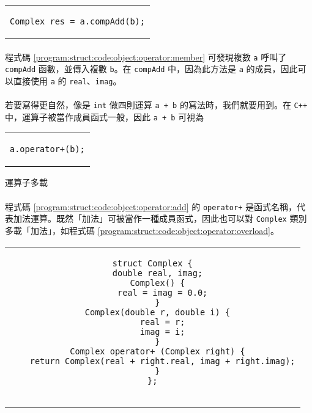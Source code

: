 \documentclass[12pt,a4paper,oneside]{report}
\begin{document}
\begin{CJK}{UTF8}{bkai}
\begin{code}[h!]
\begin{tabular}{c}
\begin{lstlisting}
Complex res = a.compAdd(b);
\end{lstlisting}
\end{tabular}
\caption{\lstinline!Complex! 相加}
\label{program:struct:code:object:operator:member}
\end{code}

\paragraph{}程式碼 \ref{program:struct:code:object:operator:member} 可發現複數 \lstinline!a! 呼叫了 \lstinline!compAdd! 函數，並傳入複數 \lstinline!b!。在 \lstinline!compAdd! 中，因為此方法是 \lstinline!a! 的成員，因此可以直接使用 \lstinline!a! 的 \lstinline!real!、\lstinline!imag!。
\paragraph{}若要寫得更自然，像是 \lstinline!int! 做四則運算 \lstinline!a + b! 的寫法時，我們就要用到。在 \texttt{C++} 中，運算子被當作成員函式一般，因此 \lstinline!a + b! 可視為

\begin{code}[h!]
\centering
\begin{tabular}{c}
\begin{lstlisting}
a.operator+(b);
\end{lstlisting}
\end{tabular}
\caption{運算子多載}
\label{program:struct:code:object:operator:add}
\end{code}

\paragraph{}程式碼 \ref{program:struct:code:object:operator:add} 的 \lstinline!operator+! 是函式名稱，代表加法運算。既然「加法」可被當作一種成員函式，因此也可以對 \lstinline!Complex! 類別多載「加法」，如程式碼 \ref{program:struct:code:object:operator:overload}。

\begin{code}[h!]
\centering
\begin{tabular}{c}
\begin{lstlisting}
struct Complex {
  double real, imag;
  Complex() {
    real = imag = 0.0;
  }
  Complex(double r, double i) {
    real = r;
    imag = i;
  }
  Complex operator+ (Complex right) {
    return Complex(real + right.real, imag + right.imag);
  }
};


\end{lstlisting}
\end{tabular}
\end{code}
\end{CJK}
\end{document}
